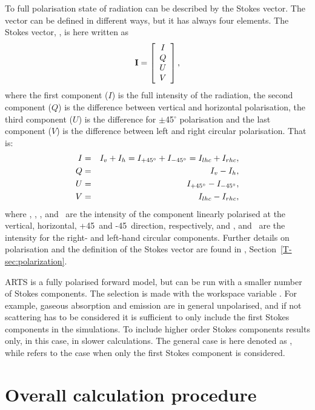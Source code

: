 To full polarisation state of radiation can be described by the Stokes
vector. The vector can be defined in different ways, but it has always
four elements. The Stokes vector, \StoVec, is here written as
\begin{equation}
  \label{eq:fm_defs:stokevec}
  {\bf I} = \left[
  \begin{array}{c}
   I\\Q\\U\\V
  \end{array}
  \right],
\end{equation}
where the first component ($I$) is the full intensity of the
radiation, the second component ($Q$) is the difference between
vertical and horizontal polarisation, the third component ($U$) is the
difference for $\pm$45$^\circ$ polarisation and the last component
($V$) is the difference between left and right circular polarisation.
That is:
\begin{eqnarray}
  I &=&   I_v + I_h = I_{+45^\circ} + I_{-45^\circ} = I_{lhc} + I_{rhc}, \\
  Q &=&   I_v - I_h,                                 \\
  U &=&   I_{+45^\circ} - I_{-45^\circ},                             \\
  V &=&   I_{lhc} - I_{rhc},                             
\end{eqnarray}
where \Iv, \Ih, \Ipff, and \Imff\ are the intensity of the component linearly
polarised at the vertical, horizontal, +45\degree\ and -45\degree\ direction,
respectively, and \Irhc, and \Ilhc\ are the intensity for the right- and
left-hand circular components. Further details on polarisation and the
definition of the Stokes vector are found in \theory,
Section~\ref{T-sec:polarization}.

ARTS is a fully polarised forward model, but can be run with a smaller
number of Stokes components. The selection is made with the workspace
variable . For example, gaseous absorption and
emission are in general unpolarised, and if not scattering has to be
considered it is sufficient to only include the first Stokes
components in the simulations. To include higher order Stokes
components results only, in this case, in slower calculations. The
general case is here denoted as ,
while  refers to the case when
only the first Stokes component is considered.
 



\section{Overall calculation procedure}
\label{sec:fm_defs:calcproc}

